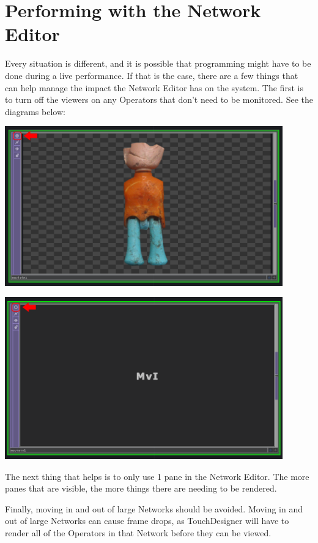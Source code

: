 
\section{Performing with the Network Editor}

\begin{fullwidth}

Every situation is different, and it is possible that programming might have to be done during a live performance. If that is the case, there are a few things that can help manage the impact the Network Editor has on the system. The first is to turn off the viewers on any Operators that don't need to be monitored. See the diagrams below:

\begin{center}
\includegraphics[width=12cm]{./img/10.2/performing-network-1.png}

\includegraphics[width=12cm]{./img/10.2/performing-network-2.png}
\end{center}

The next thing that helps is to only use 1 pane in the Network Editor. The more panes that are visible, the more things there are needing to be rendered. 

Finally, moving in and out of large Networks should be avoided. Moving in and out of large Networks can cause frame drops, as TouchDesigner will have to render all of the Operators in that Network before they can be viewed. 

\end{fullwidth}

